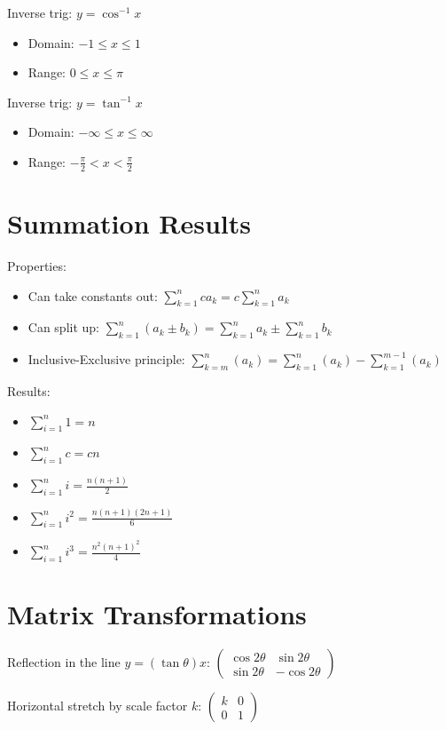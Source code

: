 \documentclass[10pt,a4paper,oneside]{book}
\begin{document}
Inverse trig: $y=\cos^{-1}x$
\begin{itemize}
    \item Domain: $-1\leq x\leq 1$
    \item Range: $0\leq x\leq \pi$
\end{itemize}

Inverse trig: $y=\tan^{-1}x$
\begin{itemize}
    \item Domain: $-\infty \leq x \leq \infty$
    \item Range: $-\frac{\pi}{2}<x<\frac{\pi}{2}$
\end{itemize}

\section*{Summation Results}
Properties:
\begin{itemize}
    \item Can take constants out: $\sum^n_{k=1}ca_k = c\sum^n_{k=1}a_k$
    \item Can split up: $\sum^n_{k=1}(a_k\pm b_k) = \sum^n_{k=1}a_k \pm \sum^n_{k=1}b_k$
    \item Inclusive-Exclusive principle: $\sum^n_{k=m}(a_k)=\sum^n_{k=1}(a_k)-\sum^{m-1}_{k=1}(a_k)$
\end{itemize}

Results:
\begin{itemize}
    \item $\sum^n_{i=1}1=n$
    \item $\sum^n_{i=1}c=cn$
    \item $\sum^n_{i=1}i=\frac{n(n+1)}{2}$
    \item $\sum^n_{i=1}i^2 = \frac{n(n+1)(2n+1)}{6}$
    \item $\sum^n_{i=1}i^3 = \frac{n^2(n+1)^2}{4}$
\end{itemize}

\section*{Matrix Transformations}
Reflection in the line $y=(\tan\theta)x$: $\begin{pmatrix}
    \cos 2\theta & \sin 2\theta \\ 
    \sin 2\theta & -\cos 2\theta 
\end{pmatrix}$

Horizontal stretch by scale factor $k$: $\begin{pmatrix}
    k & 0\\
    0 & 1
\end{pmatrix}$
\end{document}
